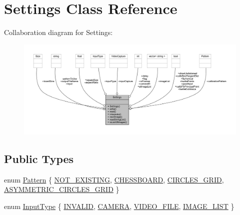 \hypertarget{classSettings}{}\section{Settings Class Reference}
\label{classSettings}


Collaboration diagram for Settings\+:
\nopagebreak
\begin{figure}[H]
\begin{center}
\leavevmode
\includegraphics[width=350pt]{classSettings__coll__graph}
\end{center}
\end{figure}
\subsection*{Public Types}
\begin{DoxyCompactItemize}
\item 
enum \mbox{\hyperlink{classSettings_a0e7117abd9427a6f8bc1d1d8d456b5c8}{Pattern}} \{ \mbox{\hyperlink{classSettings_a0e7117abd9427a6f8bc1d1d8d456b5c8ad2f421ce100bd7e0302b17bda1a74eb9}{N\+O\+T\+\_\+\+E\+X\+I\+S\+T\+I\+NG}}, 
\mbox{\hyperlink{classSettings_a0e7117abd9427a6f8bc1d1d8d456b5c8ae96aa2d60b4a554a215524a05b32908e}{C\+H\+E\+S\+S\+B\+O\+A\+RD}}, 
\mbox{\hyperlink{classSettings_a0e7117abd9427a6f8bc1d1d8d456b5c8a79472d1c69f8ed7aa1b55f908b136f68}{C\+I\+R\+C\+L\+E\+S\+\_\+\+G\+R\+ID}}, 
\mbox{\hyperlink{classSettings_a0e7117abd9427a6f8bc1d1d8d456b5c8a2cea29ee5896f2cb4cc64df25fd2375b}{A\+S\+Y\+M\+M\+E\+T\+R\+I\+C\+\_\+\+C\+I\+R\+C\+L\+E\+S\+\_\+\+G\+R\+ID}}
 \}
\item 
enum \mbox{\hyperlink{classSettings_a5afe85d24b071973a7f248c05386f7f4}{Input\+Type}} \{ \mbox{\hyperlink{classSettings_a5afe85d24b071973a7f248c05386f7f4adb44130895aedc32a119565eb6d61bed}{I\+N\+V\+A\+L\+ID}}, 
\mbox{\hyperlink{classSettings_a5afe85d24b071973a7f248c05386f7f4aba4cc7726878c8913831f0ea6360fa05}{C\+A\+M\+E\+RA}}, 
\mbox{\hyperlink{classSettings_a5afe85d24b071973a7f248c05386f7f4ac9fd97535bc651249f9eed1fddf2d36b}{V\+I\+D\+E\+O\+\_\+\+F\+I\+LE}}, 
\mbox{\hyperlink{classSettings_a5afe85d24b071973a7f248c05386f7f4a292bd2e5ba912a92ace1606e366edc4d}{I\+M\+A\+G\+E\+\_\+\+L\+I\+ST}}
 \}
\end{DoxyCompactItemize}
